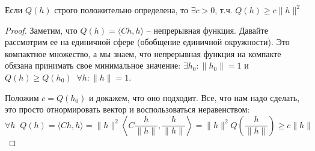 \vspace*{5mm}

\begin{lemma}
    Если $Q(h)$ строго положительно определена, то $\exists c > 0$, т.ч. $Q(h) \geqslant c\|h\|^2 $
\end{lemma}
\begin{proof}
    Заметим, что $Q(h) = \langle Ch, h \rangle$ -- непрерывная функция.
    Давайте рассмотрим ее на единичной сфере (обобщение единичной окружности).
    Это компактное множество, а мы знаем, что непрерывная функция на компакте обязана принимать свое минимальное значение: $\exists h_0 : \|h_0\| = 1$ и $Q(h) \geqslant Q(h_0) \;\; \forall h : \|h\| = 1$.
    
    Положим $c = Q(h_0)$ и докажем, что оно подходит.
    Все, что нам надо сделать, это просто отнормировать вектор и воспользоваться неравенством: \[ \forall h \;\; Q(h) = \langle Ch, h \rangle = \|h\|^2 \left\langle C \frac{h}{\|h\|}, \frac{h}{\|h\|} \right\rangle = \|h\|^2Q\left(\frac{h}{\|h\|}\right) \geqslant c\|h\| \]
\end{proof}

